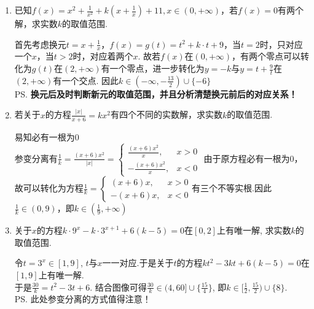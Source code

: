 \begin{enumerate}
    \item 已知$f(x) = x^2 + \frac{1}{x^2} + k (x + \frac{1}{x})+11, x \in (0, +\infty)$，若$f(x) = 0$有两个解，求实数$k$的取值范围.
    \begin{jieda}
        首先考虑换元$t = x + \frac{1}{x}$，$f(x) = g(t) = t^2+k\cdot t + 9$，当$t = 2$时，只对应一个$x$，当$t > 2$时，对应着两个$x$. 故若$f(x)$在$(0, +\infty)$，有两个零点可以转化为$g(t)$在$(2, +\infty)$有一个零点，进一步转化为$y = -k$与$y = t + \frac{9}{t}$在$(2, +\infty)$有一个交点. 因此$k \in (-\infty, -\frac{13}{2}) \cup \{-6\}$ \\
        \ps \textbf{换元后及时判断新元的取值范围，并且分析清楚换元前后的对应关系！}
    \end{jieda}
    \begin{vspace_}
    \vsp[5]
    \end{vspace_}
    \item 若关于$x$的方程$\frac{|x|}{x+6} = kx^2$有四个不同的实数解，求实数$k$的取值范围.
    \begin{jieda}
        易知必有一根为0 \\
        参变分离有$\frac{1}{k} = \frac{(x+6)x^2}{|x|} = \left \{ \begin{array}{ll}
            \frac{(x+6)x^2}{x}, & x > 0 \\
            -\frac{(x+6)x^2}{x},  & x < 0
        \end{array}\right.$
        由于原方程必有一根为0，故可以转化为方程$\frac{1}{k} = \left \{ \begin{array}{ll}
            (x+6)x, & x > 0 \\
            -(x+6)x,  & x < 0
        \end{array}\right.$有三个不等实根.因此$\frac{1}{k} \in (0, 9)$，即$k \in (\frac{1}{9}, +\infty)$
    \end{jieda}
    \begin{vspace_}
    \vsp[5]
    \end{vspace_}
    \item 关于$x$的方程$k\cdot9^x-k\cdot3^{x+1}+6(k-5)=0$在$[0,2]$上有唯一解, 求实数$k$的取值范围. 
    \begin{jieda}
    令$t=3^x\in[1,9]$, $t$与$x$一一对应.于是关于$t$的方程$kt^2-3kt+6(k-5)=0$在$[1,9]$上有唯一解. \\
    于是$\frac{30}{k}=t^2-3t+6$. 结合图像可得$\frac{30}{k}\in(4,60]\cup\{\frac{15}{4}\}$, 即$k\in[\frac{1}{2},\frac{15}{2})\cup\{8\}$. \\
    \ps 此处参变分离的方式值得注意！

\end{jieda}
\end{enumerate}
